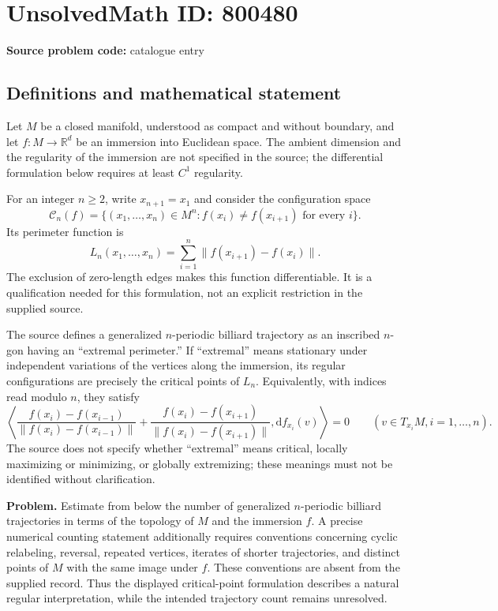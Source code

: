\documentclass[11pt]{article}
\newcommand{\R}{\mathbb{R}}
\begin{document}
\section*{UnsolvedMath ID: 800480}
\textbf{Source problem code:} catalogue entry
\subsection{Definitions and mathematical statement}
Let \(M\) be a closed manifold, understood as compact and without boundary, and let \(f\colon M\to\R^d\) be an immersion into Euclidean space. The ambient dimension and the regularity of the immersion are not specified in the source; the differential formulation below requires at least \(C^1\) regularity.

For an integer \(n\geq2\), write \(x_{n+1}=x_1\) and consider the configuration space
\[
\mathcal C_n(f)=\{(x_1,\ldots,x_n)\in M^n: f(x_i)\ne f(x_{i+1})\text{ for every }i\}.
\]
Its perimeter function is
\[
L_n(x_1,\ldots,x_n)=\sum_{i=1}^n\|f(x_{i+1})-f(x_i)\|.
\]
The exclusion of zero-length edges makes this function differentiable. It is a qualification needed for this formulation, not an explicit restriction in the supplied source.

The source defines a generalized \(n\)-periodic billiard trajectory as an inscribed \(n\)-gon having an ``extremal perimeter.'' If ``extremal'' means stationary under independent variations of the vertices along the immersion, its regular configurations are precisely the critical points of \(L_n\). Equivalently, with indices read modulo \(n\), they satisfy
\[
\left\langle
\frac{f(x_i)-f(x_{i-1})}{\|f(x_i)-f(x_{i-1})\|}
+
\frac{f(x_i)-f(x_{i+1})}{\|f(x_i)-f(x_{i+1})\|},
\mathrm df_{x_i}(v)
\right\rangle=0
\qquad(v\in T_{x_i}M,
i=1,\ldots,n).
\]
The source does not specify whether ``extremal'' means critical, locally maximizing or minimizing, or globally extremizing; these meanings must not be identified without clarification.

\textbf{Problem.} Estimate from below the number of generalized \(n\)-periodic billiard trajectories in terms of the topology of \(M\) and the immersion \(f\). A precise numerical counting statement additionally requires conventions concerning cyclic relabeling, reversal, repeated vertices, iterates of shorter trajectories, and distinct points of \(M\) with the same image under \(f\). These conventions are absent from the supplied record. Thus the displayed critical-point formulation describes a natural regular interpretation, while the intended trajectory count remains unresolved.
\end{document}
